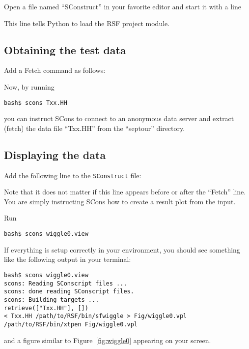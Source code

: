 Open a file named ``SConstruct'' in your favorite editor and start it with a
line 



This line tells Python to load the RSF project module.

\subsection{Obtaining the test data}

Add a Fetch command as follows:



Now, by running 
\begin{verbatim}
bash$ scons Txx.HH
\end{verbatim}
you can instruct SCons to connect to an anonymous data server and extract
(fetch) the data file ``Txx.HH'' from the ``septour'' directory.

\subsection{Displaying the data}


Add the following line to the \texttt{SConstruct} file:



Note that it does not matter if this line appears before or after the
``Fetch'' line. You are simply instructing SCons how to create a
result plot from the input.

Run
\begin{verbatim}
bash$ scons wiggle0.view
\end{verbatim}
If everything is setup correctly in your environment, you should see 
something like the following output in your terminal:
\begin{verbatim}
bash$ scons wiggle0.view
scons: Reading SConscript files ...
scons: done reading SConscript files.
scons: Building targets ...
retrieve(["Txx.HH"], [])
< Txx.HH /path/to/RSF/bin/sfwiggle > Fig/wiggle0.vpl
/path/to/RSF/bin/xtpen Fig/wiggle0.vpl
\end{verbatim}
and a figure similar to Figure~\ref{fig:wiggle0} appearing on your screen.


